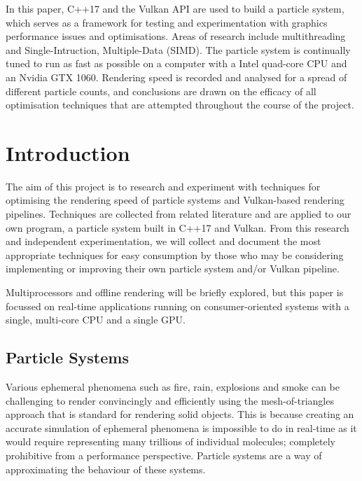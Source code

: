 \documentclass[11pt, a4paper, twocolumn]{article}
\begin{document}
In this paper, C++17 and the Vulkan API are used to build a particle system, which serves as a framework for testing and experimentation with graphics performance issues and optimisations. Areas of research include multithreading and Single-Intruction, Multiple-Data (SIMD). The particle system is continually tuned to run as fast as possible on a computer with a Intel quad-core CPU and an Nvidia GTX 1060. Rendering speed is recorded and analysed for a spread of different particle counts, and conclusions are drawn on the efficacy of all optimisation techniques that are attempted throughout the course of the project.

\twocolumn

\renewcommand{\cfttoctitlefont}{\sffamily\bfseries\Large}
\renewcommand{\cftsecfont}{\sffamily\bfseries}
\tableofcontents

\renewcommand{\cftloftitlefont}{\sffamily\bfseries\Large}
\listoffigures

\newpage

\section{Introduction}

The aim of this project is to research and experiment with techniques for optimising the rendering speed of particle systems and Vulkan-based rendering pipelines. Techniques are collected from related literature and are applied to our own program, a particle system built in C++17 and Vulkan. From this research and independent experimentation, we will collect and document the most appropriate techniques for easy consumption by those who may be considering implementing or improving their own particle system and/or Vulkan pipeline.

Multiprocessors and offline rendering will be briefly explored, but this paper is focussed on real-time applications running on consumer-oriented systems with a single, multi-core CPU and a single GPU.

\subsection{Particle Systems}

Various ephemeral phenomena such as fire, rain, explosions and smoke can be challenging to render convincingly and efficiently using the mesh-of-triangles approach that is standard for rendering solid objects. This is because creating an accurate simulation of ephemeral phenomena is impossible to do in real-time as it would require representing many trillions of individual molecules; completely prohibitive from a performance perspective. Particle systems are a way of approximating the behaviour of these systems.
\end{document}

